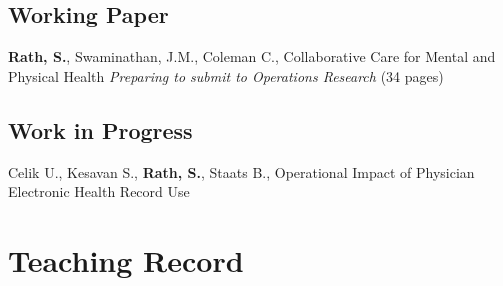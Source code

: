 \documentclass[11pt,a4paper]{article}
\renewenvironment{itemize}{
	\begin{list}{}{
			\setlength{\leftmargin}{1.5em}
		}
	}{
\end{list}
}
\begin{document}
\subsection*{Working Paper}
\begin{itemize}
	\item \textbf{Rath, S.}, Swaminathan, J.M., Coleman C., Collaborative Care for Mental and Physical Health \emph{Preparing to submit to Operations Research} (34 pages)

\end{itemize}

\subsection*{Work in Progress}

\begin{itemize}

	\item Celik U., Kesavan S.,  \textbf{Rath, S.}, Staats B., Operational Impact of Physician Electronic Health Record Use
\end{itemize}

%


	\section*{\textbf{Teaching Record}}
\end{document}
